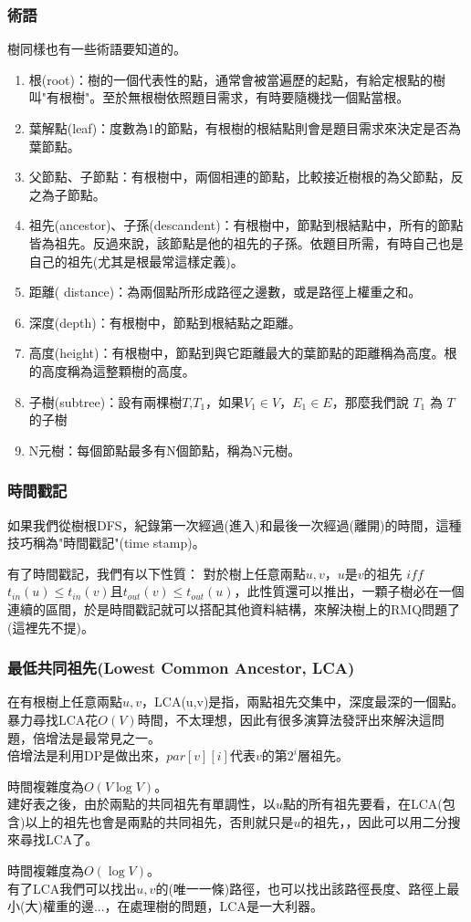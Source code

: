 \subsubsection{術語}
樹同樣也有一些術語要知道的。
\begin{enumerate}
\item 根(root)：樹的一個代表性的點，通常會被當遍歷的起點，有給定根點的樹叫"有根樹"。至於無根樹依照題目需求，有時要隨機找一個點當根。
\item 葉解點(leaf)：度數為1的節點，有根樹的根結點則會是題目需求來決定是否為葉節點。
\item 父節點、子節點：有根樹中，兩個相連的節點，比較接近樹根的為父節點，反之為子節點。
\item 祖先(ancestor)、子孫(descandent)：有根樹中，節點到根結點中，所有的節點皆為祖先。反過來說，該節點是他的祖先的子孫。依題目所需，有時自己也是自己的祖先(尤其是根最常這樣定義)。
\item 距離( distance)：為兩個點所形成路徑之邊數，或是路徑上權重之和。
\item 深度(depth)：有根樹中，節點到根結點之距離。
\item 高度(height)：有根樹中，節點到與它距離最大的葉節點的距離稱為高度。根的高度稱為這整顆樹的高度。
\item 子樹(subtree)：設有兩棵樹$T$,$T_1$，如果$V_1\in V$，$E_1\in E$，那麼我們說 $T_1$ 為 $T$ 的子樹
\item N元樹：每個節點最多有N個節點，稱為N元樹。
\end{enumerate}
\subsubsection{時間戳記}
如果我們從樹根DFS，紀錄第一次經過(進入)和最後一次經過(離開)的時間，這種技巧稱為"時間戳記"(time stamp)。

有了時間戳記，我們有以下性質：
對於樹上任意兩點$u,v$，$u$是$v$的祖先 $iff$ $t_{in}(u) \leq t_{in}(v)$且$t_{out}(v) \leq t_{out}(u)$，此性質還可以推出，一顆子樹必在一個連續的區間，於是時間戳記就可以搭配其他資料結構，來解決樹上的RMQ問題了(這裡先不提)。
\subsubsection{最低共同祖先(Lowest Common Ancestor, LCA)}
在有根樹上任意兩點$u,v$，LCA(u,v)是指，兩點祖先交集中，深度最深的一個點。暴力尋找LCA花$O(V)$時間，不太理想，因此有很多演算法發評出來解決這問題，倍增法是最常見之一。\\
倍增法是利用DP是做出來，$par[v][i]$代表$v$的第$2^i$層祖先。

時間複雜度為$O(V\log V)$。\\
建好表之後，由於兩點的共同祖先有單調性，以$u$點的所有祖先要看，在LCA(包含)以上的祖先也會是兩點的共同祖先，否則就只是$u$的祖先，，因此可以用二分搜來尋找LCA了。

時間複雜度為$O(\log V)$。\\
有了LCA我們可以找出$u, v$的(唯一一條)路徑，也可以找出該路徑長度、路徑上最小(大)權重的邊...，在處理樹的問題，LCA是一大利器。
